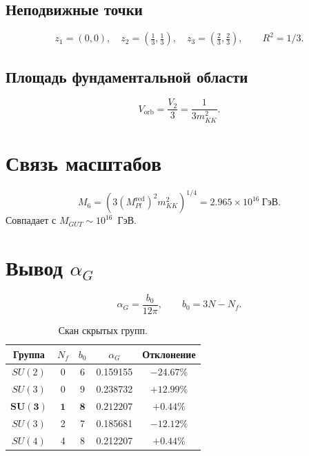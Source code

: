 \documentclass[12pt,a4paper]{article}
\numberwithin{equation}{section}
\begin{document}
\subsection{Неподвижные точки}
\begin{equation}
z_1 = (0,0), \quad z_2 = \left(\tfrac13,\tfrac13\right), 
\quad z_3 = \left(\tfrac23,\tfrac23\right), \qquad R^2 = 1/3.
\end{equation}

\subsection{Площадь фундаментальной области}
\begin{equation}
V_{\text{orb}} = \frac{V_2}{3} = \frac{1}{3m_{KK}^2}.
\end{equation}

\section{Связь масштабов}
\begin{equation}
M_6 = \left(3(M_{Pl}^{\text{red}})^2 m_{KK}^2\right)^{1/4} 
= 2.965\times 10^{16}~\text{ГэВ}.
\end{equation}
Совпадает с $M_{GUT} \sim 10^{16}$~ГэВ.

\section{Вывод $\alpha_G$}
\begin{equation}
\alpha_G = \frac{b_0}{12\pi}, \qquad b_0 = 3N - N_f.
\end{equation}

\begin{table}[h!]
\centering
\caption{Скан скрытых групп.}
\begin{tabular}{|c|c|c|c|c|}
\hline
Группа & $N_f$ & $b_0$ & $\alpha_G$ & Отклонение \\
\hline
$SU(2)$ & 0 & 6 & 0.159155 & $-24.67\%$ \\
$SU(3)$ & 0 & 9 & 0.238732 & $+12.99\%$ \\
$\mathbf{SU(3)}$ & $\mathbf{1}$ & $\mathbf{8}$ & $\mathbf{0.212207}$ 
& $\mathbf{+0.44\%}$ \\
$SU(3)$ & 2 & 7 & 0.185681 & $-12.12\%$ \\
$SU(4)$ & 4 & 8 & 0.212207 & $+0.44\%$ \\
\hline
\end{tabular}
\end{table}
\end{document}
